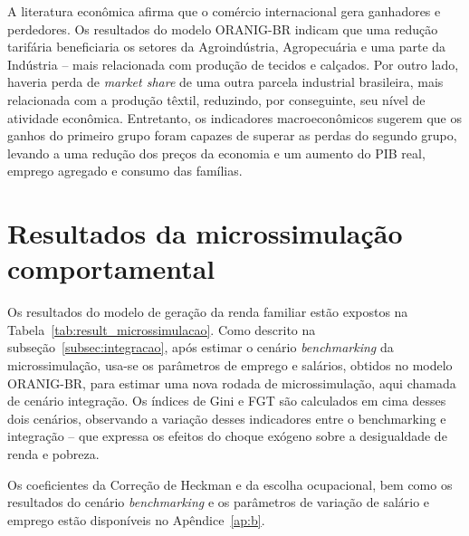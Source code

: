 A literatura econômica afirma que o comércio internacional gera ganhadores e perdedores. Os resultados do modelo ORANIG-BR indicam que uma redução tarifária beneficiaria os setores da Agroindústria, Agropecuária e uma parte da Indústria -- mais relacionada com produção de tecidos e calçados. Por outro lado, haveria perda de \textit{market share} de uma outra parcela industrial brasileira, mais relacionada com a produção têxtil, reduzindo, por conseguinte, seu nível de atividade econômica. Entretanto, os indicadores macroeconômicos sugerem que os ganhos do primeiro grupo foram capazes de superar as perdas do segundo grupo, levando a uma redução dos preços da economia e um aumento do PIB real, emprego agregado e consumo das famílias.



\section{Resultados da microssimulação comportamental} \label{sec:microssimulacao}

Os resultados do modelo de geração da renda familiar estão expostos na Tabela~\ref{tab:result_microssimulacao}. Como descrito na subseção~\ref{subsec:integracao}, após estimar o cenário \textit{benchmarking} da microssimulação, usa-se os parâmetros de emprego e salários, obtidos no modelo ORANIG-BR, para estimar uma nova rodada de microssimulação, aqui chamada de cenário integração. Os índices de Gini e FGT são calculados em cima desses dois cenários, observando a variação desses indicadores entre o benchmarking e integração -- que expressa os efeitos do choque exógeno sobre a desigualdade de renda e pobreza.

Os coeficientes da Correção de Heckman e da escolha ocupacional, bem como os resultados do cenário \textit{benchmarking} e os parâmetros de variação de salário e emprego estão disponíveis no Apêndice~\ref{ap:b}.

